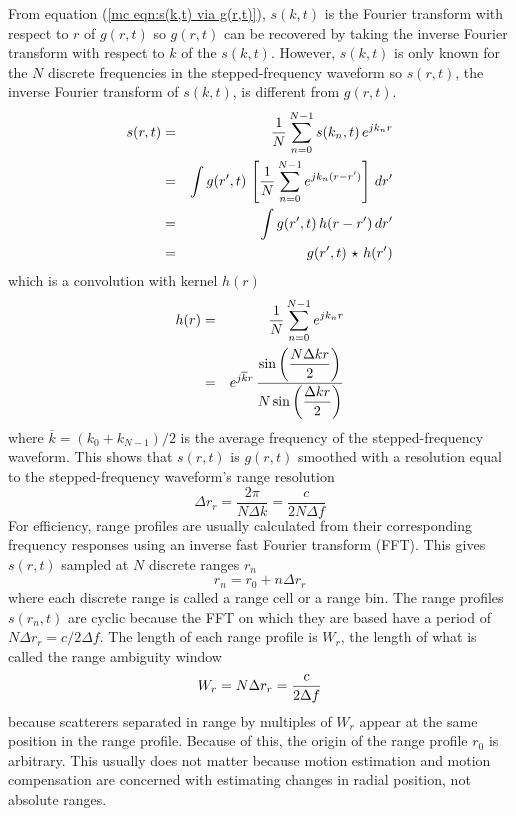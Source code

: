 From equation (\ref{mc eqn:s(k,t) via g(r,t)}), $s(k,t)$ is the Fourier 
transform with respect to $r$ of $g(r,t)$ so $g(r,t)$ can be recovered by 
taking the inverse Fourier transform with respect to $k$ of the $s(k,t)$. 
However, $s(k,t)$ is only known for the $N$ discrete frequencies in the
stepped-frequency waveform so $s(r,t)$, the inverse Fourier transform of
$s(k,t)$, is different from $g(r,t)$.
\begin{eqnarray}
s(r,t)
&=&\frac{1}{N}\sum_{n=0}^{N-1} s(k_n,t)\, e^{jk_nr}		  {\nonumber}\\
&=&\int g(r',t)\,\left[\frac{1}{N}\sum_{n=0}^{N-1} e^{jk_n(r-r')}\right]
	\,dr'  {\nonumber}\\
&=&\int g(r',t)\,h(r-r')\,dr'	{\nonumber}\\
&=&g(r',t)\,{\,\star\,}\, h(r')
\label{mc eqn:s(r,t)}
\end{eqnarray}
which is a convolution with kernel $h(r)$ 
\begin{eqnarray}
h(r)&=&\frac{1}{N}\sum_{n=0}^{N-1} e^{jk_nr} 		{\nonumber}\\
    &=&e^{j\overline{k}r}\,\frac{\displaystyle\sin\left(\frac{N\Delta kr}{2}\right)}
		{\displaystyle N\sin\left(\frac{\Delta kr}{2}\right)}		
\end{eqnarray}
where $\overline{k}=(k_0+k_{N-1})/2$ is the average frequency of the
stepped-frequency waveform.  This shows that $s(r,t)$ is $g(r,t)$ smoothed
with a resolution equal to the stepped-frequency waveform's range resolution
\begin{equation}
\Delta r_r=\frac{2\pi}{N\Delta k}=\frac{c}{2N\Delta f}
\end{equation}
For efficiency, range profiles are usually calculated from their 
corresponding frequency responses using an inverse fast Fourier transform
(FFT).  This gives $s(r,t)$ sampled at $N$ discrete ranges $r_n$ 
\begin{equation}
r_n=r_0+n\Delta r_r
\end{equation}
where each discrete range is called a range cell or a range bin.
The range profiles $s(r_n,t)$ are cyclic because the FFT on which they are
based have a period of $N\Delta r_r=c/2\Delta f$.   The length of each range
profile is $W_r$, the length of what is called the range ambiguity window 
\begin{equation}
W_r=N\Delta r_r=\frac{c}{2{\Delta f}}
\end{equation}
because scatterers separated in range by multiples of $W_r$ appear
at the same position in the range profile.  Because of this, the origin of
the range profile $r_0$ is arbitrary.  This usually does not matter because
motion estimation and motion compensation are concerned with estimating
changes in radial position, not absolute ranges.

